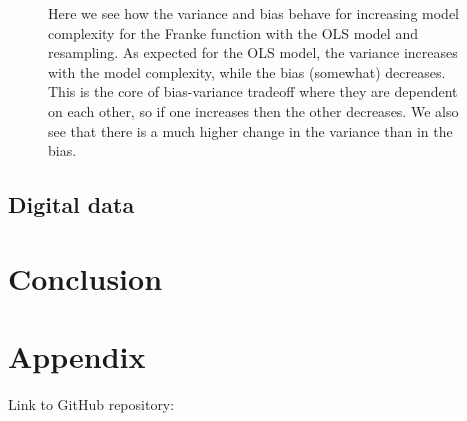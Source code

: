 \documentclass[12pt,a4paper,english]{article}
\begin{document}
\begin{figure}[htbp]
	\caption{Here we see how the variance and bias behave for increasing model complexity for the Franke function with the OLS model and resampling. As expected for the OLS model, the variance increases with the model complexity, while the bias (somewhat) decreases. This is the core of bias-variance tradeoff where they are dependent on each other, so if one increases then the other decreases. We also see that there is a much higher change in the variance than in the bias.\label{fig:var_bias}}
\end{figure}


\subsection{Digital data}
\section{Conclusion}

\appendix
\section{Appendix}
\label{sect:appendix}
Link to GitHub repository:\\
\end{document}

